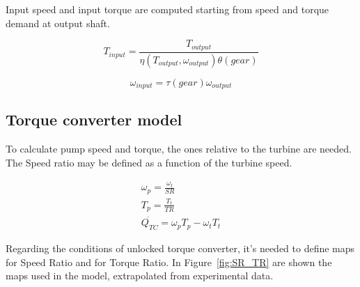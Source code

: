 Input speed and input torque are computed starting from speed and torque demand at output shaft.

\begin{equation}
  T_{input}=\frac{T_{output}}{\eta(T_{output},\omega_{output})\theta(gear)}
\end{equation}

\begin{equation}
  \omega_{input}=\tau(gear)\omega_{output}
\end{equation}
\subsection{Torque converter model}
To calculate pump speed and torque, the ones relative to the turbine are needed. The Speed ratio may be defined as a function of the turbine speed.

\begin{gather*}
  \omega_{p}    = \frac{\omega_{t}}{SR}             \\
  T_{p}  = \frac{T_{t}}{TR} \\
     \dot{Q_{TC}}  = \omega_{p}T_{p} - \omega_{t}T_{t} 
\end{gather*}

Regarding the conditions of unlocked torque converter, it's needed to define maps for Speed Ratio and for Torque Ratio. In Figure~\ref{fig:SR_TR} are shown the maps used in the model, extrapolated from experimental data.

